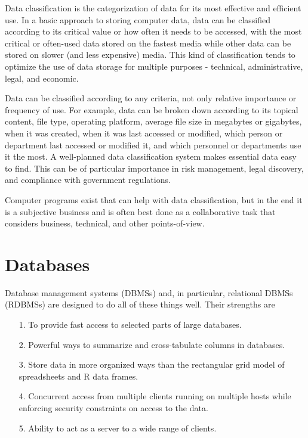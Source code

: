 \documentclass[12pt]{article}
\begin{document}
Data classification is the categorization of data for its most effective and efficient use. In a basic approach to storing computer data, data can be classified according to its critical value or how often it needs to be accessed, with the most critical or often-used data stored on the fastest media while other data can be stored on slower (and less expensive) media. This kind of classification tends to optimize the use of data storage for multiple purposes - technical, administrative, legal, and economic.

Data can be classified according to any criteria, not only relative importance or frequency of use. For example, data can be broken down according to its topical content, file type, operating platform, average file size in megabytes or gigabytes, when it was created, when it was last accessed or modified, which person or department last accessed or modified it, and which personnel or departments use it the most. A well-planned data classification system makes essential data easy to find. This can be of particular importance in risk management, legal discovery, and compliance with government regulations.

Computer programs exist that can help with data classification, but in the end it is a subjective business and is often best done as a collaborative task that considers business, technical, and other points-of-view.

\section{Databases}
Database management systems (DBMSs) and, in particular, relational DBMSs (RDBMSs)
are designed to do all of these things well. Their strengths are

\begin{itemize}
\item[1.] To provide fast access to selected parts of large databases.
\item[2.] Powerful ways to summarize and cross-tabulate columns in databases.
\item[3.] Store data in more organized ways than the rectangular grid model of spreadsheets and R
data frames.
\item[4.] Concurrent access from multiple clients running on multiple hosts while enforcing security
constraints on access to the data.
\item[5.] Ability to act as a server to a wide range of clients.
\end{itemize}
\end{document}
